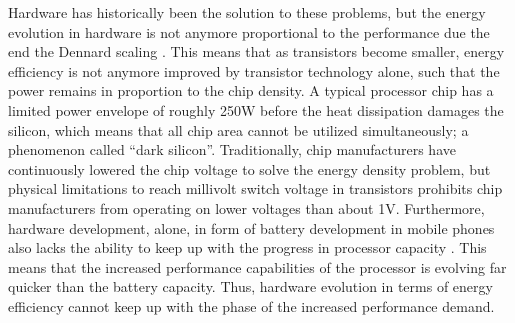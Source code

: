 \documentclass{article}
\begin{document}
Hardware has historically been the solution to these problems, but the energy evolution in hardware is not anymore proportional to the performance due the end the Dennard scaling  \cite{Dennard:74}.
This means that as transistors become smaller, energy efficiency is not anymore improved by transistor technology alone, such that the power remains in proportion to the chip density. 
A typical processor chip has a limited power envelope of roughly 250W before the heat dissipation damages the silicon,
which means that all chip area cannot be utilized simultaneously; a phenomenon called ``dark silicon''.
Traditionally, chip manufacturers have continuously lowered the chip voltage to solve the energy density problem,
but physical limitations to reach millivolt switch voltage in transistors prohibits chip manufacturers from operating on lower voltages than about 1V. 
Furthermore, hardware development, alone, in form of battery development in mobile phones also lacks the ability to keep up with the progress in processor capacity \cite{CPUCapacity,BatteryCapacity}.
This means that the increased performance capabilities of the processor is evolving far quicker than the battery capacity.
Thus, hardware evolution in terms of energy efficiency cannot keep up with the phase of the increased performance demand.\smallskip
\end{document}
